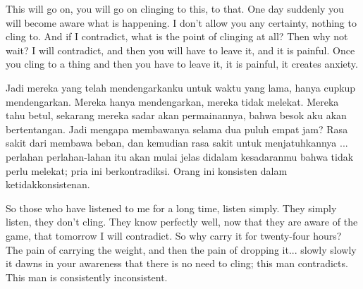 \english
This will go on, you will go on clinging to this, to that. One day suddenly you will become aware what is happening. I don't allow you any certainty, nothing to cling to. And if I contradict, what is the point of clinging at all? Then why not wait? I will contradict, and then you will have to leave it, and it is painful. Once you cling to a thing and then you have to leave it, it is painful, it creates anxiety.

\bahasa
Jadi mereka yang telah mendengarkanku untuk waktu yang lama, hanya cupkup mendengarkan. Mereka hanya mendengarkan, mereka tidak melekat. Mereka tahu betul, sekarang mereka sadar akan permainannya, bahwa besok aku akan bertentangan. Jadi mengapa membawanya selama dua puluh empat jam? Rasa sakit dari membawa beban, dan kemudian rasa sakit untuk menjatuhkannya ... perlahan perlahan-lahan itu akan mulai jelas didalam kesadaranmu bahwa tidak perlu melekat; pria ini berkontradiksi. Orang ini konsisten dalam ketidakkonsistenan.

\english
So those who have listened to me for a long time, listen simply. They simply listen, they don't cling. They know perfectly well, now that they are aware of the game, that tomorrow I will contradict. So why carry it for twenty-four hours? The pain of carrying the weight, and then the pain of dropping it... slowly slowly it dawns in your awareness that there is no need to cling; this man contradicts. This man is consistently inconsistent.



















